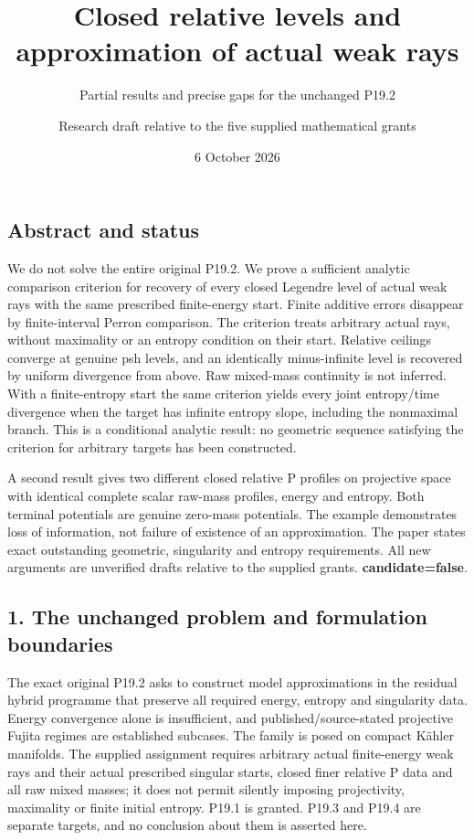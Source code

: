 \documentclass[
  11pt,
]{article}
\title{Closed relative levels and approximation of actual weak rays}
\subtitle{Partial results and precise gaps for the unchanged P19.2}
\author{Research draft relative to the five supplied mathematical
grants}
\date{6 October 2026}
\begin{document}
\maketitle

\subsection{Abstract and status}\label{abstract-and-status}

We do not solve the entire original P19.2. We prove a sufficient
analytic comparison criterion for recovery of every closed Legendre
level of actual weak rays with the same prescribed finite-energy start.
Finite additive errors disappear by finite-interval Perron comparison.
The criterion treats arbitrary actual rays, without maximality or an
entropy condition on their start. Relative ceilings converge at genuine
psh levels, and an identically minus-infinite level is recovered by
uniform divergence from above. Raw mixed-mass continuity is not
inferred. With a finite-entropy start the same criterion yields every
joint entropy/time divergence when the target has infinite entropy
slope, including the nonmaximal branch. This is a conditional analytic
result: no geometric sequence satisfying the criterion for arbitrary
targets has been constructed.

A second result gives two different closed relative P profiles on
projective space with identical complete scalar raw-mass profiles,
energy and entropy. Both terminal potentials are genuine zero-mass
potentials. The example demonstrates loss of information, not failure of
existence of an approximation. The paper states exact outstanding
geometric, singularity and entropy requirements. All new arguments are
unverified drafts relative to the supplied grants.
\textbf{candidate=false}.

\subsection{1. The unchanged problem and formulation
boundaries}\label{the-unchanged-problem-and-formulation-boundaries}

The exact original P19.2 asks to construct model approximations in the
residual hybrid programme that preserve all required energy, entropy and
singularity data. Energy convergence alone is insufficient, and
published/source-stated projective Fujita regimes are established
subcases. The family is posed on compact Kähler manifolds. The supplied
assignment requires arbitrary actual finite-energy weak rays and their
actual prescribed singular starts, closed finer relative P data and all
raw mixed masses; it does not permit silently imposing projectivity,
maximality or finite initial entropy. P19.1 is granted. P19.3 and P19.4
are separate targets, and no conclusion about them is asserted here.
\end{document}
